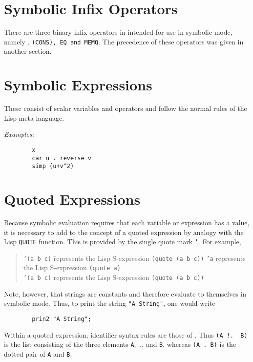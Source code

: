 \section{Symbolic Infix Operators}

There are three binary infix operators in {\REDUCE} intended for use in
symbolic mode, namely . {\tt (CONS), EQ and MEMQ}. The precedence of
these operators was given in another section.

\section{Symbolic Expressions}

These consist of scalar variables and operators and follow the normal
rules of the Lisp meta language.

{\it Examples:}
\begin{verbatim}
        x
        car u . reverse v
        simp (u+v^2)
\end{verbatim}

\section{Quoted Expressions}

Because symbolic evaluation requires that each variable or expression has a
value, it is necessary to add to {\REDUCE} the concept of a quoted expression
by analogy with the Lisp {\tt QUOTE} function. This is provided by the single
quote mark {\tt '}.  For example,
\begin{quote}
\begin{tabbing}
{\tt '(a b c)} \= represents the Lisp S-expression \= {\tt (quote (a b
c))}\kill
{\tt 'a} \> represents the Lisp S-expression \>
{\tt (quote a)} \\
{\tt '(a b c)} \> represents the Lisp S-expression \> {\tt (quote (a b c))}
\end{tabbing}
\end{quote}
Note, however, that strings are constants and therefore evaluate to
themselves in symbolic mode. Thus, to print the string {\tt "A String"}, one
would write
\begin{verbatim}
        prin2 "A String";
\end{verbatim}
Within a quoted expression, identifier syntax rules are those of {\REDUCE}.
Thus {\tt  (A~!.~~B)} is the list consisting of the three elements {\tt A},
{\tt .}, and {\tt B}, whereas {\tt (A .  B)} is the dotted pair of {\tt A}
and {\tt B}.

